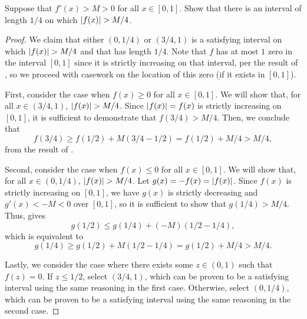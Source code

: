 \begin{problem}
  Suppose that $f'(x) > M > 0$ for all $x \in [0,1]$. Show that there is an
  interval of length $1/4$ on which $\left\lvert f(x) \right\rvert > M/4$. 

  \begin{proof}
    We claim that either $(0, 1/4)$ or $(3/4, 1)$ is a satisfying interval on
    which $\left\lvert f(x) \right\rvert > M/4$ and that has length $1/4$. Note that $f$ has at
    most $1$ zero in the interval $[0, 1]$ since it is strictly increasing on
    that interval, per the result of
    , so we proceed with
    casework on the location of this zero (if it exists in $[0, 1]$).

    First, consider the case when $f(x) \geq 0$ for all $x \in [0, 1]$. We will show that, for all 
    $x \in (3/4, 1)$, $\left\lvert f(x) \right\rvert > M/4$. Since $\left\lvert f(x) \right\rvert = f(x)$ is strictly increasing on $[0, 1]$, 
    it is sufficient to demonstrate that $f(3/4) > M/4$. Then, we conclude that
    \[
      f(3/4) \geq f(1/2) + M(3/4 - 1/2) = f(1/2) + M/4 > M/4,
    \]
    from the result of .

    Second, consider the case when $f(x) \leq 0$ for all $x \in [0, 1]$. We
    will show that, for all $x \in (0, 1/4)$, $\left\lvert f(x) \right\rvert > M/4$.
    Let $g(x) = -f(x) = \left\lvert f(x) \right\rvert$. Since $f(x)$ is strictly increasing on $[0, 1]$, we
    have $g(x)$ is strictly decreasing and $g'(x) < -M < 0$ over $[0, 1]$, so
    it is sufficient to show that $g(1/4) > M/4$. Thus,  
     gives
    \[
      g(1/2) \leq g(1/4) + (-M)(1/2 - 1/4),
    \]
    which is equivalent to
    \[
      g(1/4) \geq g(1/2) + M(1/2 - 1/4) = g(1/2) + M/4 > M/4.
    \]

    Lastly, we consider the case where there exists some $z \in (0, 1)$ such
    that $f(z) = 0$. If $z \leq 1/2$, select $(3/4, 1)$, which can be proven to
    be a satisfying interval using the same reasoning in the first
    case. Otherwise, select $(0, 1/4)$, which can be proven to be a satisfying
    interval using the same reasoning in the second case.
  \end{proof}
\end{problem}

